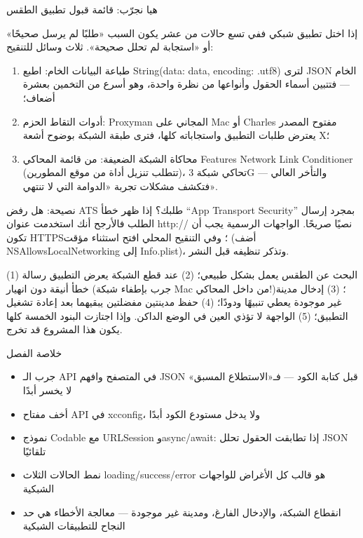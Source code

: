 \begin{tcbpractice}{هيا نجرّب: قائمة قبول تطبيق الطقس}

إذا اختل تطبيق شبكي ففي تسع حالات من عشر يكون السبب «طلبًا لم يرسل صحيحًا» أو «استجابة لم تحلل صحيحة». ثلاث وسائل للتنقيح:

\begin{enumerate}
  \item طباعة البيانات الخام: اطبع String(data: data, encoding: .utf8) لترى JSON الخام — فتتبين أسماء الحقول وأنواعها من نظرة واحدة، وهو أسرع من التخمين بعشرة أضعاف؛
  \item أدوات التقاط الحزم: Proxyman المجاني على Mac أو Charles مفتوح المصدر يعترض طلبات التطبيق واستجاباته كلها، فترى طبقة الشبكة بوضوح أشعة X؛
  \item محاكاة الشبكة الضعيفة: من قائمة المحاكي Features Network Link Conditioner (تتطلب تنزيل أداة من موقع المطورين)، تحاكي شبكة 3G والتأخر العالي — فتكشف مشكلات تجربة «الدوامة التي لا تنتهي».
\end{enumerate}

\begin{tcbinfo}{نصيحة: هل رفض ATS طلبك؟}
إذا ظهر خطأ “App Transport Security” بمجرد إرسال الطلب فالأرجح أنك استخدمت عنوان http:// نصيًا صريحًا. الواجهات الرسمية يجب أن تكون HTTPS؛ وفي التنقيح المحلي افتح استثناء مؤقت (أضف NSAllowsLocalNetworking إلى Info.plist)، وتذكر تنظيفه قبل النشر.

\end{tcbinfo}

(1) البحث عن الطقس يعمل بشكل طبيعي؛ (2) عند قطع الشبكة يعرض التطبيق رسالة خطأ أنيقة دون انهيار (جرب بإطفاء شبكة Mac من داخل المحاكي!)؛ (3) إدخال مدينة غير موجودة يعطي تنبيهًا ودودًا؛ (4) حفظ مدينتين مفضلتين يبقيهما بعد إعادة تشغيل التطبيق؛ (5) الواجهة لا تؤذي العين في الوضع الداكن. وإذا اجتازت البنود الخمسة كلها يكون هذا المشروع قد تخرج.

\end{tcbpractice}

\begin{tcbsummary}{خلاصة الفصل}
\begin{itemize}
  \item جرب الـ API في المتصفح وافهم JSON قبل كتابة الكود — فـ«الاستطلاع المسبق» لا يخسر أبدًا
  \item أخف مفتاح API في xcconfig، ولا يدخل مستودع الكود أبدًا
  \item نموذج Codable مع URLSession وasync/await: إذا تطابقت الحقول تحلل JSON تلقائيًا
  \item نمط الحالات الثلاث loading/success/error هو قالب كل الأغراض للواجهات الشبكية
  \item انقطاع الشبكة، والإدخال الفارغ، ومدينة غير موجودة — معالجة الأخطاء هي حد النجاح للتطبيقات الشبكية
\end{itemize}

\end{tcbsummary}
